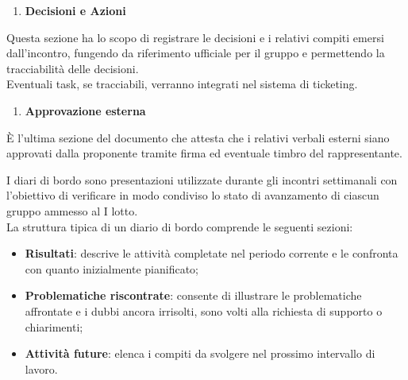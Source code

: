     \begin{enumerate}[resume*, itemsep=0pt, parsep=1pt, leftmargin=*, label=\arabic*.]
        \item \textbf{Decisioni e Azioni}
    \end{enumerate}
    \vspace{-0.5em}
    Questa sezione ha lo scopo di registrare le decisioni e i relativi compiti emersi dall'incontro, fungendo da riferimento ufficiale per il gruppo e permettendo la tracciabilità delle decisioni.\\
    Eventuali task, se tracciabili, verranno integrati nel sistema di ticketing.
    \begin{enumerate}[resume*, itemsep=0pt, parsep=1pt, leftmargin=*, label=\arabic*.]
        \item \textbf{Approvazione esterna}
    \end{enumerate}
    \vspace{-0.5em}
    È l'ultima sezione del documento che attesta che i relativi verbali esterni siano approvati dalla proponente tramite firma ed eventuale timbro del rappresentante.

\vspace{0.7em}
    I diari di bordo sono presentazioni utilizzate durante gli incontri settimanali con l'obiettivo di verificare in modo condiviso lo stato di avanzamento di ciascun gruppo ammesso al I lotto.\\
    La struttura tipica di un diario di bordo comprende le seguenti sezioni:
    \begin{itemize}[itemsep=3pt, parsep=1pt, label=$\scriptstyle\bullet$]
        \item \textbf{Risultati}: descrive le attività completate nel periodo corrente e le confronta con quanto inizialmente pianificato;
        \item \textbf{Problematiche riscontrate}: consente di illustrare le problematiche affrontate e i dubbi ancora irrisolti, sono volti alla richiesta di supporto o chiarimenti;
        \item \textbf{Attività future}: elenca i compiti da svolgere nel prossimo intervallo di lavoro.
    \end{itemize}

